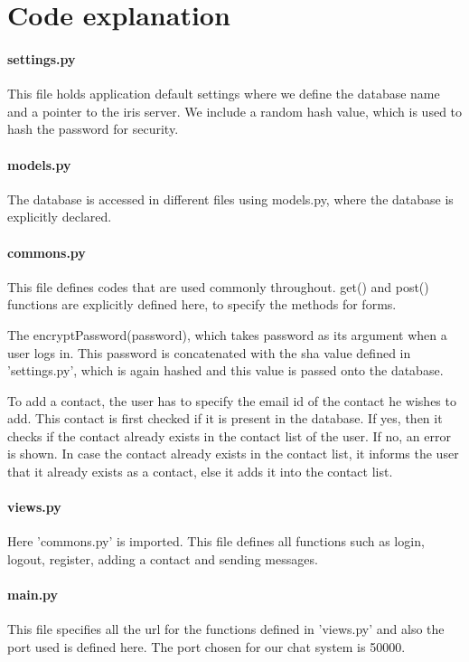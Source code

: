 \documentclass[a4paper,11pt,conference]{IEEEtran}
\begin{document}
\section{Code explanation}

\paragraph{settings.py}
This file holds application default settings where we define the database name and a pointer to the iris server. We include a random hash value, which is used to hash the password  for security. 
\paragraph{models.py}
The database is accessed in different files using models.py, where the database is explicitly declared.
\paragraph{commons.py}
This file defines codes that are used commonly throughout. get() and post() functions are explicitly defined here, to specify the methods for forms. 

The encryptPassword(password), which takes password as its argument when a user logs in. This password is concatenated with the sha value defined in 'settings.py', which is again hashed and this value is passed onto the database.

To add a contact, the user has to specify the email id of the contact he wishes to add. This contact is first checked if it is present in the database. If yes, then it checks if the contact already exists in the contact list of the user. If no, an error is shown. In case the contact already exists in the contact list, it informs the user that it already exists as a contact, else it adds it into the contact list.
\paragraph{views.py}
Here 'commons.py' is imported. This file defines all functions such as login, logout, register, adding a contact and sending messages. 
\paragraph{main.py}
This file specifies all the url for the functions defined in 'views.py' and also the port used is defined here. The port chosen for our chat system is 50000.
\end{document}
